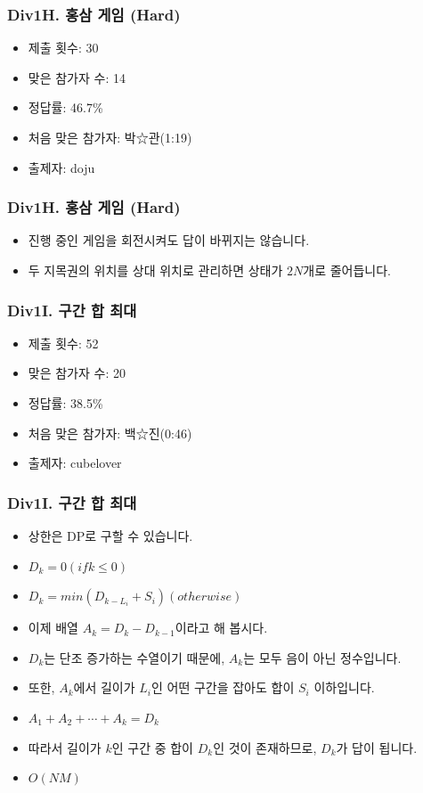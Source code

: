 \documentclass[xetex]{beamer}
\begin{document}
\begin{frame}
  \frametitle{Div1H. 홍삼 게임 (Hard)}
  \begin{itemize}
    \item 제출 횟수: 30
    \item 맞은 참가자 수: 14
    \item 정답률: 46.7\%
    \item 처음 맞은 참가자: 박☆관(1:19)
    \item 출제자: doju
  \end{itemize}
\end{frame}

\begin{frame}
  \frametitle{Div1H. 홍삼 게임 (Hard)}
  \begin{itemize}
    \item 진행 중인 게임을 회전시켜도 답이 바뀌지는 않습니다.
    \item 두 지목권의 위치를 상대 위치로 관리하면 상태가 $2N$개로 줄어듭니다.
  \end{itemize}
\end{frame}

\begin{frame}
  \frametitle{Div1I. 구간 합 최대}
  \begin{itemize}
    \item 제출 횟수: 52
    \item 맞은 참가자 수: 20
    \item 정답률: 38.5\%
    \item 처음 맞은 참가자: 백☆진(0:46)
    \item 출제자: cubelover
  \end{itemize}
\end{frame}

\begin{frame}
  \frametitle{Div1I. 구간 합 최대}
  \begin{itemize}
    \item 상한은 DP로 구할 수 있습니다.
    \item $D_k = 0 (if k \le 0)$
    \item $D_k = min ( D_{k - L_i} + S_i ) (otherwise)$
    \item 이제 배열 $A_k = D_k - D_{k - 1}$이라고 해 봅시다.
    \item $D_k$는 단조 증가하는 수열이기 때문에, $A_k$는 모두 음이 아닌 정수입니다.
    \item 또한, $A_k$에서 길이가 $L_i$인 어떤 구간을 잡아도 합이 $S_i$ 이하입니다.
    \item $A_1 + A_2 + \cdots + A_k = D_k$
    \item 따라서 길이가 $k$인 구간 중 합이 $D_k$인 것이 존재하므로, $D_k$가 답이 됩니다.
    \item $O(NM)$
  \end{itemize}
\end{frame}
\end{document}
